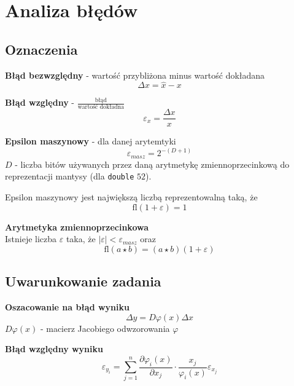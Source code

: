 \documentclass[../mn-notatki.tex]{subfiles}
\newcommand{\fl}{\text{fl}}
\begin{document}
\section{Analiza błędów}

\subsection{Oznaczenia}

\begin{tcolorbox}
\textbf{Błąd bezwzględny} - wartość przybliżona minus wartość dokładana
\[
\Delta x = \hat{x} - x
\]
\end{tcolorbox}

\begin{tcolorbox}
\textbf{Błąd względny} - $\frac{\text{błąd}}{\text{wartość dokładna}}$
\[
\varepsilon_x = \frac{\Delta x}{x}
\]
\end{tcolorbox}

\begin{tcolorbox}
\textbf{Epsilon maszynowy} - dla danej arytemtyki
\[
\varepsilon_{masz} = 2^{-(D+1)}
\]
$D$ - liczba bitów używanych przez daną arytmetykę zmiennoprzecinkową do
reprezentacji mantysy (dla \texttt{double} $52$).

Epsilon maszynowy jest największą liczbą reprezentowalną taką, że
\[
\fl(1 + \varepsilon) = 1
\]
\end{tcolorbox}

\begin{tcolorbox}
\textbf{Arytmetyka zmiennoprzecinkowa}\\
Istnieje liczba $\varepsilon$ taka, że $|\varepsilon| < \varepsilon_{masz}$ oraz
\[
\fl(a \star b) = (a \star b)(1 + \varepsilon)
\]
\end{tcolorbox}


\subsection{Uwarunkowanie zadania}

\begin{tcolorbox}
\textbf{Oszacowanie na błąd wyniku}\\
\[
\Delta y = D \varphi(x) \Delta x
\]
$D \varphi(x)$ - macierz Jacobiego odwzorowania $\varphi$
\end{tcolorbox}

\begin{tcolorbox}
\textbf{Błąd względny wyniku}\\
\[
\varepsilon_{y_i} = \sum_{j=1}^{n} \frac{\partial \varphi_i(x)}{\partial x_j}
\cdot \frac{x_j}{\varphi_i(x)} \varepsilon_{x_j}
\]
\end{tcolorbox}
\end{document}
